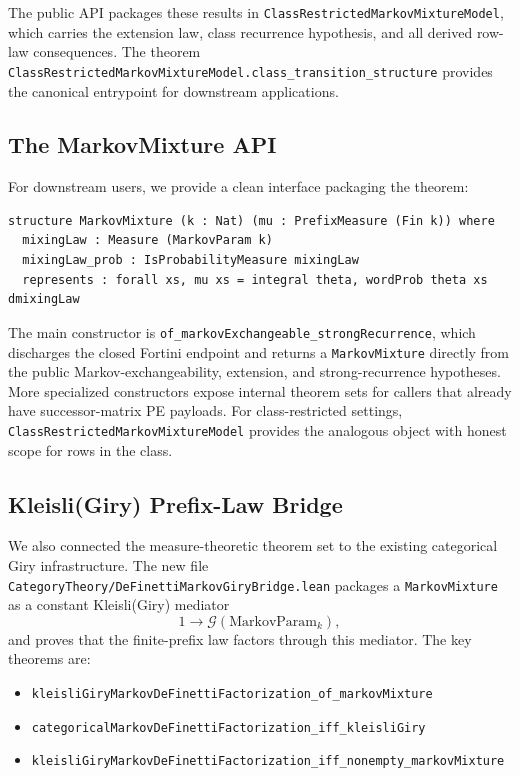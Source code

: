 \documentclass[11pt,a4paper]{article}
\theoremstyle{definition}
\begin{document}
The public API packages these results in \texttt{ClassRestrictedMarkovMixtureModel},
which carries the extension law, class recurrence hypothesis, and all derived
row-law consequences. The theorem
\texttt{ClassRestrictedMarkovMixtureModel.class\_transition\_structure}
provides the canonical entrypoint for downstream applications.

\subsection{The MarkovMixture API}

For downstream users, we provide a clean interface packaging the theorem:

\begin{lstlisting}
structure MarkovMixture (k : Nat) (mu : PrefixMeasure (Fin k)) where
  mixingLaw : Measure (MarkovParam k)
  mixingLaw_prob : IsProbabilityMeasure mixingLaw
  represents : forall xs, mu xs = integral theta, wordProb theta xs dmixingLaw
\end{lstlisting}

The main constructor is
\texttt{of\_markovExchangeable\_strongRecurrence}, which discharges the closed
Fortini endpoint and returns a \texttt{MarkovMixture} directly from the public
Markov-exchangeability, extension, and strong-recurrence hypotheses. More
specialized constructors expose internal theorem sets for callers that
already have successor-matrix PE payloads. For class-restricted settings,
\texttt{ClassRestrictedMarkovMixtureModel} provides the analogous object
with honest scope for rows in the class.

\subsection{Kleisli(Giry) Prefix-Law Bridge}

We also connected the measure-theoretic theorem set to the existing
categorical Giry infrastructure. The new file
\texttt{CategoryTheory/DeFinettiMarkovGiryBridge.lean} packages a
\texttt{MarkovMixture} as a constant Kleisli(Giry) mediator
\[
1 \to \mathcal{G}(\mathrm{MarkovParam}_k),
\]
and proves that the finite-prefix law factors through this mediator. The key
theorems are:
\begin{itemize}
\item \texttt{kleisliGiryMarkovDeFinettiFactorization\_of\_markovMixture}
\item \texttt{categoricalMarkovDeFinettiFactorization\_iff\_kleisliGiry}
\item \texttt{kleisliGiryMarkovDeFinettiFactorization\_iff\_nonempty\_markovMixture}
\end{itemize}
\end{document}
